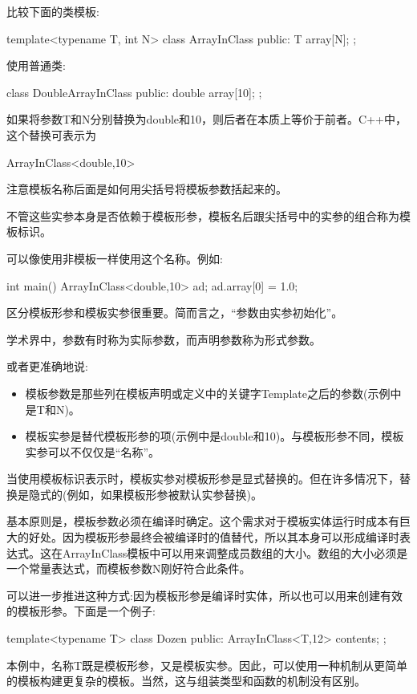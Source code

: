 
比较下面的类模板:

\begin{cpp}
template<typename T, int N>
class ArrayInClass {
	public:
	T array[N];
};
\end{cpp}

使用普通类:

\begin{cpp}
class DoubleArrayInClass {
	public:
	double array[10];
};
\end{cpp}

如果将参数T和N分别替换为double和10，则后者在本质上等价于前者。C++中，这个替换可表示为

\begin{cpp}
ArrayInClass<double,10>
\end{cpp}

注意模板名称后面是如何用尖括号将模板参数括起来的。

不管这些实参本身是否依赖于模板形参，模板名后跟尖括号中的实参的组合称为模板标识。

可以像使用非模板一样使用这个名称。例如:

\begin{cpp}
int main()
{
	ArrayInClass<double,10> ad;
	ad.array[0] = 1.0;
}
\end{cpp}

区分模板形参和模板实参很重要。简而言之，“参数由实参初始化”。

\begin{notice}学术界中，参数有时称为实际参数，而声明参数称为形式参数。
\end{notice}

或者更准确地说:

\begin{itemize}
\item 
模板参数是那些列在模板声明或定义中的关键字Template之后的参数(示例中是T和N)。

\item 
模板实参是替代模板形参的项(示例中是double和10)。与模板形参不同，模板实参可以不仅仅是“名称”。
\end{itemize}

当使用模板标识表示时，模板实参对模板形参是显式替换的。但在许多情况下，替换是隐式的(例如，如果模板形参被默认实参替换)。

基本原则是，模板参数必须在编译时确定。这个需求对于模板实体运行时成本有巨大的好处。因为模板形参最终会被编译时的值替代，所以其本身可以形成编译时表达式。这在ArrayInClass模板中可以用来调整成员数组的大小。数组的大小必须是一个常量表达式，而模板参数N刚好符合此条件。

可以进一步推进这种方式:因为模板形参是编译时实体，所以也可以用来创建有效的模板形参。下面是一个例子:

\begin{cpp}
template<typename T>
class Dozen {
	public:
	ArrayInClass<T,12> contents;
};
\end{cpp}

本例中，名称T既是模板形参，又是模板实参。因此，可以使用一种机制从更简单的模板构建更复杂的模板。当然，这与组装类型和函数的机制没有区别。


























